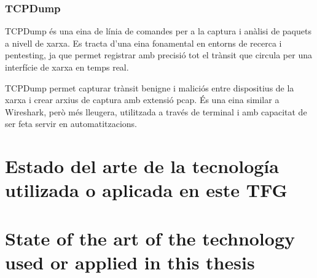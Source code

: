     \subsection{TCPDump}
    TCPDump és una eina de línia de comandes per a la captura i anàlisi de paquets a nivell de xarxa. Es tracta d’una eina fonamental en entorns de recerca i pentesting, ja que permet registrar amb precisió tot el trànsit que circula per una interfície de xarxa en temps real. \cite{wtfexp}
    
    TCPDump permet capturar trànsit benigne i maliciós entre dispositius de la xarxa i crear arxius de captura amb extensió pcap. És una eina similar a Wireshark, però més lleugera, utilitzada a través de terminal i amb capacitat de ser feta servir en automatitzacions.
    
    \or
  \chapter[Estado del arte]{Estado del arte de la tecnología utilizada o aplicada en este TFG}

\else
  \chapter[State of the art]{State of the art of the technology used or applied in this thesis}

\fi



